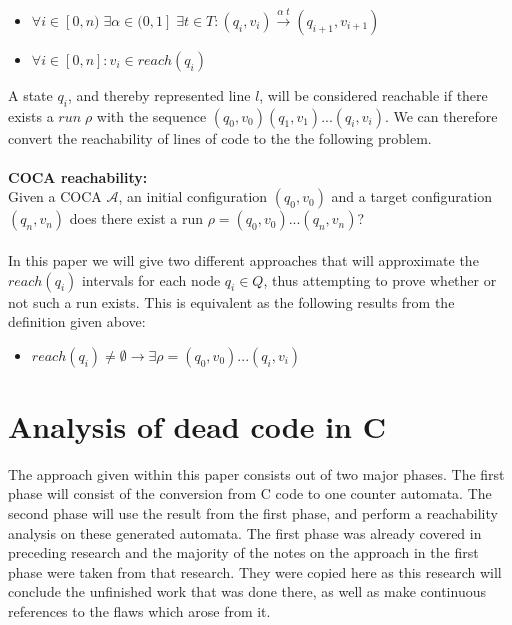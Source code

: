 \documentclass[12pt]{thesis}
\begin{document}
\begin{itemize}
	\item $\forall i \in [0, n)\;\exists \alpha \in (0, 1]\;\exists t \in T: (q_i, v_i) \xrightarrow{\alpha\;t}(q_{i+1}, v_{i+1})$
	\item $\forall i \in [0, n]: v_i \in reach(q_i)$
\end{itemize}

A state $q_i$, and thereby represented line $l$, will be considered reachable if there exists a $run\;\rho$ with the sequence $(q_0, v_0)(q_1, v_1)...(q_i, v_i)$. We can therefore convert the reachability of lines of code to the the following problem. \\
\\
\noindent
\textbf{COCA reachability:} \\
Given a COCA $\mathcal{A}$, an initial configuration $(q_0, v_0)$ and a target configuration $(q_n, v_n)$ does there exist a run $\rho = (q_0, v_0) ... (q_n, v_n)$?\\
\\
In this paper we will give two different approaches that will approximate the $reach(q_i)$ intervals for each node $q_i \in Q$, thus attempting to prove whether or not such a run exists. This is equivalent as the following results from the definition given above:

\begin{itemize}
	\item $reach(q_i) \neq \emptyset \rightarrow \exists \rho = (q_0, v_0) ... (q_i, v_i)$
\end{itemize}

\chapter{Analysis of dead code in C}
The approach given within this paper consists out of two major phases. The first phase will consist of the conversion from C code to one counter automata. The second phase will use the result from the first phase, and perform a reachability analysis on these generated automata. The first phase was already covered in preceding research and the majority of the notes on the approach in the first phase were taken from that research. They were copied here as this research will conclude the unfinished work that was done there, as well as make continuous references to the flaws which arose from it.
\end{document}
